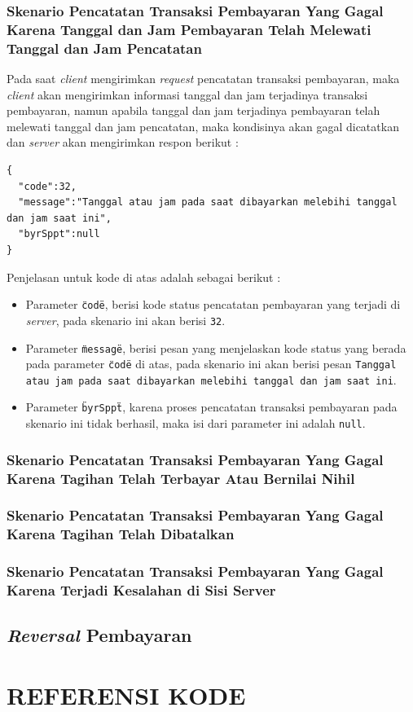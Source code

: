 \documentclass[pdftex,12pt, oneside]{article}
\begin{document}
  \subsubsection{Skenario Pencatatan Transaksi Pembayaran Yang Gagal Karena Tanggal dan Jam Pembayaran Telah Melewati Tanggal dan Jam Pencatatan}
  
  Pada saat \textit{client} mengirimkan \textit{request} pencatatan transaksi pembayaran, maka \textit{client} akan mengirimkan informasi tanggal dan jam terjadinya transaksi pembayaran, namun apabila tanggal dan jam terjadinya pembayaran telah melewati tanggal dan jam pencatatan, maka kondisinya akan gagal dicatatkan dan \textit{server} akan mengirimkan respon berikut :
  
  \begin{lstlisting}
{
  "code":32,
  "message":"Tanggal atau jam pada saat dibayarkan melebihi tanggal dan jam saat ini",
  "byrSppt":null
}
  \end{lstlisting}
  
  Penjelasan untuk kode di atas adalah sebagai berikut :
  
  \begin{itemize}
    \item Parameter \texttt{\"code\"}, berisi kode status pencatatan pembayaran yang terjadi di \textit{server}, pada skenario ini akan berisi \texttt{32}.
    \item Parameter \texttt{\"message\"}, berisi pesan yang menjelaskan kode status yang berada pada parameter \texttt{\"code\"} di atas, pada skenario ini akan berisi pesan \texttt{Tanggal atau jam pada saat dibayarkan melebihi tanggal dan jam saat ini}.
    \item Parameter \texttt{\"byrSppt\"}, karena proses pencatatan transaksi pembayaran pada skenario ini tidak berhasil, maka isi dari parameter ini adalah \texttt{null}.
  \end{itemize}
  
  \subsubsection{Skenario Pencatatan Transaksi Pembayaran Yang Gagal Karena Tagihan Telah Terbayar Atau Bernilai Nihil}
  \subsubsection{Skenario Pencatatan Transaksi Pembayaran Yang Gagal Karena Tagihan Telah Dibatalkan}
  \subsubsection{Skenario Pencatatan Transaksi Pembayaran Yang Gagal Karena Terjadi Kesalahan di Sisi Server}  

\subsection{\textit{Reversal} Pembayaran}

\section{REFERENSI KODE}
\end{document}
